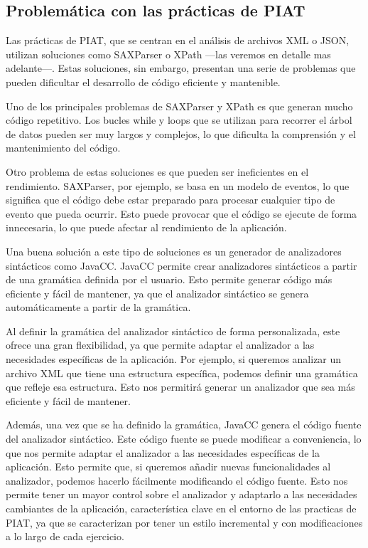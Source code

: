 \subsection{Problemática con las prácticas de PIAT}

\noindent Las prácticas de PIAT, que se centran en el análisis de archivos XML o JSON,  utilizan soluciones como SAXParser o XPath ---las veremos en detalle mas adelante---. Estas soluciones, sin embargo, presentan una serie de problemas que pueden dificultar el desarrollo de código eficiente y mantenible.

Uno de los principales problemas de SAXParser y XPath es que generan mucho código repetitivo. Los bucles while y loops que se utilizan para recorrer el árbol de datos pueden ser muy largos y complejos, lo que dificulta la comprensión y el mantenimiento del código.

Otro problema de estas soluciones es que pueden ser ineficientes en el rendimiento. SAXParser, por ejemplo, se basa en un modelo de eventos, lo que significa que el código debe estar preparado para procesar cualquier tipo de evento que pueda ocurrir. Esto puede provocar que el código se ejecute de forma innecesaria, lo que puede afectar al rendimiento de la aplicación.

Una buena solución a este tipo de soluciones es un generador de analizadores sintácticos como JavaCC. JavaCC permite crear analizadores sintácticos a partir de una gramática definida por el usuario. Esto permite generar código más eficiente y fácil de mantener, ya que el analizador sintáctico se genera automáticamente a partir de la gramática.

Al definir la gramática del analizador sintáctico de forma personalizada, este ofrece una gran flexibilidad, ya que permite adaptar el analizador a las necesidades específicas de la aplicación. Por ejemplo, si queremos analizar un archivo XML que tiene una estructura específica, podemos definir una gramática que refleje esa estructura. Esto nos permitirá generar un analizador que sea más eficiente y fácil de mantener.

Además, una vez que se ha definido la gramática, JavaCC genera el código fuente del analizador sintáctico. Este código fuente se puede modificar a conveniencia, lo que nos permite adaptar el analizador a las necesidades específicas de la aplicación. Esto permite que, si queremos añadir nuevas funcionalidades al analizador, podemos hacerlo fácilmente modificando el código fuente. Esto nos permite tener un mayor control sobre el analizador y adaptarlo a las necesidades cambiantes de la aplicación, característica clave en el entorno de las practicas de PIAT, ya que se caracterizan por tener un estilo incremental y con modificaciones a lo largo de cada ejercicio.

